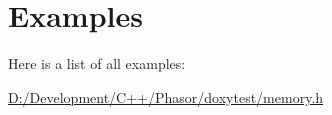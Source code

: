 \section{Examples}
Here is a list of all examples\-:\begin{DoxyCompactItemize}
\item 
\hyperlink{_d_1_2_development_2_c_09_09_2_phasor_2doxytest_2memory_8h-example}{D\-:/\-Development/\-C++/\-Phasor/doxytest/memory.\-h}
\end{DoxyCompactItemize}

